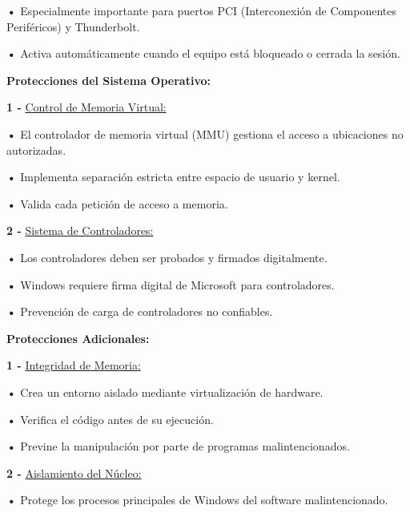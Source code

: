 \documentclass{article}
\begin{document}
\textbf{    •} { Especialmente importante para puertos PCI (Interconexión de Componentes Periféricos) y Thunderbolt.}

\textbf{    •} { Activa automáticamente cuando el equipo está bloqueado o cerrada la sesión.}



\quad

\textbf{Protecciones del Sistema Operativo: }

\quad

\textbf{1 -  } {\underline{Control de Memoria Virtual: }}

\quad

\textbf{    •} { El controlador de memoria virtual (MMU) gestiona el acceso a ubicaciones no autorizadas.}

\textbf{    •} { Implementa separación estricta entre espacio de usuario y kernel.}

\textbf{    •} { Valida cada petición de acceso a memoria.}


\quad

\textbf{2 -  } {\underline{Sistema de Controladores: }}

\quad

\textbf{    •} { Los controladores deben ser probados y firmados digitalmente.}

\textbf{    •} { Windows requiere firma digital de Microsoft para controladores.}

\textbf{    •} { Prevención de carga de controladores no confiables.}





\quad

\textbf{Protecciones Adicionales: }

\quad

\textbf{1 -  } {\underline{Integridad de Memoria: }}

\quad

\textbf{    •} { Crea un entorno aislado mediante virtualización de hardware.}

\textbf{    •} { Verifica el código antes de su ejecución.}

\textbf{    •} { Previne la manipulación por parte de programas malintencionados.}


\quad

\textbf{2 -  } {\underline{Aislamiento del Núcleo: }}

\quad

\textbf{    •} { Protege los procesos principales de Windows del software malintencionado.}
\end{document}
